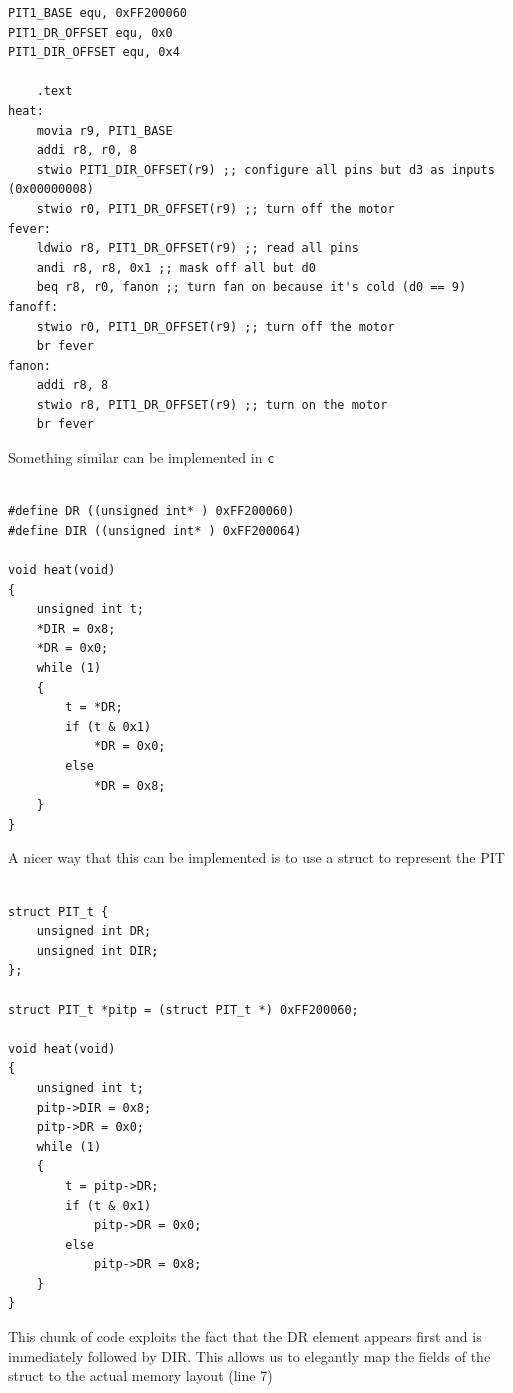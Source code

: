 \documentclass[../notes.tex]{subfiles}
\begin{document}
\begin{listing}[H]
\begin{verbatim}
PIT1_BASE equ, 0xFF200060
PIT1_DR_OFFSET equ, 0x0
PIT1_DIR_OFFSET equ, 0x4

	.text
heat:
	movia r9, PIT1_BASE
	addi r8, r0, 8
	stwio PIT1_DIR_OFFSET(r9) ;; configure all pins but d3 as inputs (0x00000008)
	stwio r0, PIT1_DR_OFFSET(r9) ;; turn off the motor
fever:
	ldwio r8, PIT1_DR_OFFSET(r9) ;; read all pins
	andi r8, r8, 0x1 ;; mask off all but d0
	beq r8, r0, fanon ;; turn fan on because it's cold (d0 == 9)
fanoff:
	stwio r0, PIT1_DR_OFFSET(r9) ;; turn off the motor
	br fever
fanon:
	addi r8, 8
	stwio r8, PIT1_DR_OFFSET(r9) ;; turn on the motor
	br fever
\end{verbatim}
\end{listing}

Something similar can be implemented in \texttt{c} 

\begin{listing}[H]
\begin{verbatim}

#define DR ((unsigned int* ) 0xFF200060)
#define DIR ((unsigned int* ) 0xFF200064)

void heat(void)
{
	unsigned int t;
	*DIR = 0x8;
	*DR = 0x0;
	while (1)
	{
		t = *DR;
		if (t & 0x1)
			*DR = 0x0;
		else
			*DR = 0x8;
	}
}
\end{verbatim}
\end{listing}


A nicer way that this can be implemented is to use a struct to represent the PIT


\begin{listing}[H]
\begin{verbatim}

struct PIT_t {
	unsigned int DR;
	unsigned int DIR;
};

struct PIT_t *pitp = (struct PIT_t *) 0xFF200060;

void heat(void)
{
	unsigned int t;
	pitp->DIR = 0x8;
	pitp->DR = 0x0;
	while (1)
	{
		t = pitp->DR;
		if (t & 0x1)
			pitp->DR = 0x0;
		else
			pitp->DR = 0x8;
	}
}
\end{verbatim}
\end{listing}

This chunk of code exploits the fact that the DR element appears first and is immediately followed by DIR. This allows us to elegantly map the fields of the struct to the actual memory layout (line 7)
\end{document}
